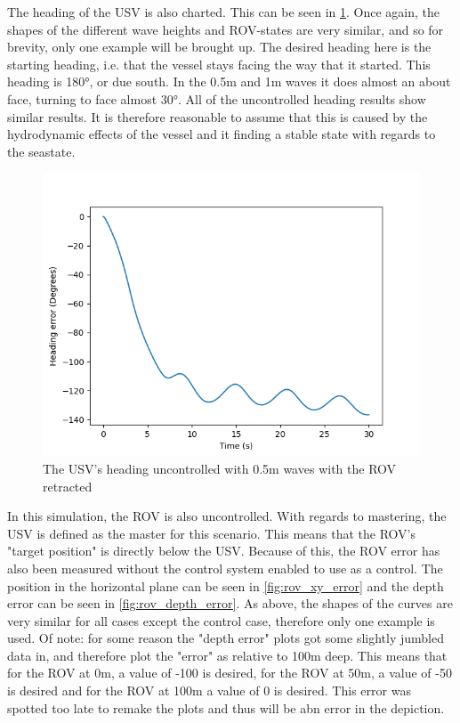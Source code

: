 \documentclass[class=article, crop=false]{standalone}
\begin{document}
The heading of the USV is also charted. This can be seen in \cref{fig:0.5m-heading-unc}. Once again, the shapes of the different wave heights and ROV-states are very similar, and so for brevity, only one example will be brought up. The desired heading here is the starting heading, i.e. that the vessel stays facing the way that it started. This heading is 180°, or due south. In the 0.5m and 1m waves it does almost an about face, turning to face almost 30°. All of the uncontrolled heading results show similar results. It is therefore reasonable to assume that this is caused by the hydrodynamic effects of the vessel and it finding a stable state with regards to the seastate.

\begin{figure}
    \centering
    \includegraphics{scenario1/rov-0m/0.5m/usv_heading_error_uncontrolled}
    \caption{The USV's heading uncontrolled with 0.5m waves with the ROV retracted}
    \label{fig:0.5m-heading-unc}
\end{figure}

In this simulation, the ROV is also uncontrolled. With regards to mastering, the USV is defined as the master for this scenario. This means that the ROV's "target position" is directly below the USV. Because of this, the ROV error has also been measured without the control system enabled to use as a control. The position in the horizontal plane can be seen in \cref{fig:rov_xy_error} and the depth error can be seen in \cref{fig:rov_depth_error}. As above, the shapes of the curves are very similar for all cases except the control case, therefore only one example is used. Of note: for some reason the "depth error" plots got some slightly jumbled data in, and therefore plot the "error" as relative to 100m deep. This means that for the ROV at 0m, a value of -100 is desired, for the ROV at 50m, a value of -50 is desired and for the ROV at 100m a value of 0 is desired. This error was spotted too late to remake the plots and thus will be abn error in the depiction.
\end{document}

